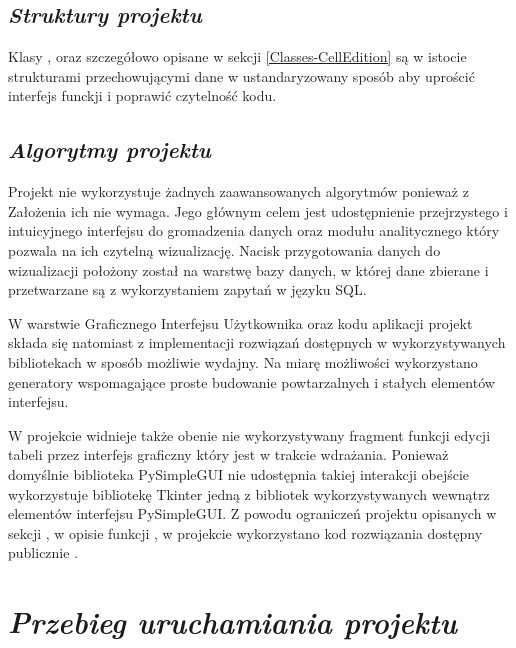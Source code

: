 \documentclass[a4paper,10pt, twoside]{report}
\newcommand{\customstylechapter}[1]{\large{\textit{#1}}}
\newcommand{\customstylesection}[1]{\textbf{\textit{#1}}}
\begin{document}
\section{\customstylesection{Struktury projektu}}
{Klasy ,  oraz  
szczegółowo opisane w sekcji \ref*{Classes-CellEdition} są w istocie strukturami
 przechowującymi dane w ustandaryzowany sposób aby uprościć interfejs funckji i 
poprawić czytelność kodu.}

\section{\customstylesection{Algorytmy projektu}}
{Projekt nie wykorzystuje żadnych zaawansowanych algorytmów ponieważ z Założenia
 ich nie wymaga. Jego głównym celem jest udostępnienie przejrzystego i 
intuicyjnego interfejsu do gromadzenia danych oraz modułu analitycznego który 
pozwala na ich czytelną wizualizację. Nacisk przygotowania danych do 
wizualizacji położony został na warstwę bazy danych, w której dane zbierane i 
przetwarzane są z wykorzystaniem zapytań w języku SQL.}

{W warstwie Graficznego Interfejsu Użytkownika oraz kodu aplikacji projekt 
składa się natomiast z implementacji rozwiązań dostępnych w wykorzystywanych 
bibliotekach w sposób możliwie wydajny. Na miarę możliwości wykorzystano 
generatory wspomagające proste budowanie powtarzalnych i stałych elementów 
interfejsu.}

{W projekcie widnieje także obenie nie wykorzystywany fragment funkcji edycji 
tabeli przez interfejs graficzny który jest w trakcie wdrażania. Ponieważ 
domyślnie biblioteka PySimpleGUI nie udostępnia takiej interakcji obejście 
wykorzystuje bibliotekę Tkinter \cite{Tkinter} jedną z bibliotek wykorzystywanych
wewnątrz elementów interfejsu PySimpleGUI. Z powodu ograniczeń projektu 
opisanych w sekcji , w opisie funkcji 
, w projekcie wykorzystano kod rozwiązania dostępny 
publicznie \cite{EdittableTable}.}

\chapter{\customstylechapter{Przebieg uruchamiania projektu}}
\end{document}
